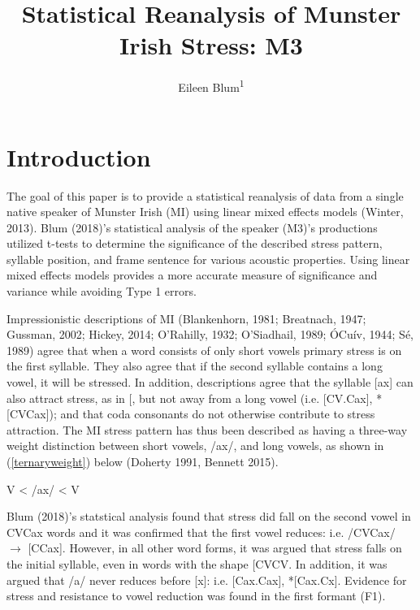\documentclass[floatsintext,man]{apa6}
\title{Statistical Reanalysis of Munster Irish Stress: M3}
\author{Eileen Blum\textsuperscript{1}}
\affiliation{
    \vspace{0.5cm}
          \textsuperscript{1} Rutgers University  }
\theoremstyle{definition}
\theoremstyle{definition}
\theoremstyle{definition}
\theoremstyle{remark}
\begin{document}
\maketitle

\setcounter{secnumdepth}{0}



\section{Introduction}\label{introduction}

The goal of this paper is to provide a statistical reanalysis of data
from a single native speaker of Munster Irish (MI) using linear mixed
effects models (Winter, 2013). Blum (2018)'s statistical analysis of the
speaker (M3)'s productions utilized t-tests to determine the
significance of the described stress pattern, syllable position, and
frame sentence for various acoustic properties. Using linear mixed
effects models provides a more accurate measure of significance and
variance while avoiding Type 1 errors.

Impressionistic descriptions of MI (Blankenhorn, 1981; Breatnach, 1947;
Gussman, 2002; Hickey, 2014; O'Rahilly, 1932; O'Siadhail, 1989; ÓCuív,
1944; Sé, 1989) agree that when a word consists of only short vowels
primary stress is on the first syllable. They also agree that if the
second syllable contains a long vowel, it will be stressed. In addition,
descriptions agree that the syllable {[}ax{]} can also attract stress,
as in {[}\textipa{b@"kax}{]}, but not away from a long vowel (i.e.
{[}CV\textipa{:}.Cax{]}, *{[}CVCax{]}); and that
coda consonants do not otherwise contribute to stress attraction. The MI
stress pattern has thus been described as having a three-way weight
distinction between short vowels, /ax/, and long vowels, as shown in
(\ref{ternaryweight}) below (Doherty 1991, Bennett 2015).

\begin{exe}
  \ex \label{ternaryweight}
  V < /ax/ < V\textipa{:}
\end{exe}

Blum (2018)'s statstical analysis found that stress did fall on the
second vowel in CVCax words and it was confirmed that the first vowel
reduces: i.e. /CVCax/ \(\rightarrow\) {[}CCax{]}. However,
in all other word forms, it was argued that stress falls on the initial
syllable, even in words with the shape {[}CVCV\textipa{:}{]}. In
addition, it was argued that /a/ never reduces before {[}x{]}: i.e.
{[}Cax.Cax{]}, *{[}Cax.Cx{]}. Evidence for stress
and resistance to vowel reduction was found in the first formant (F1).
\end{document}
